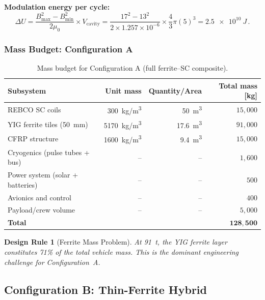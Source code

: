 \documentclass[11pt,a4paper]{article}
\newtheorem{designrule}{Design Rule}
\begin{document}
\textbf{Modulation energy per cycle:}
\begin{equation}
\Delta U = \frac{B_{\max}^2 - B_{\min}^2}{2\mu_0} \times V_{\mathrm{cavity}}
= \frac{17^2 - 13^2}{2 \times 1.257 \times 10^{-6}} \times \frac{4}{3}\pi(5)^3
= \SI{2.5e10}{J}\,.
\end{equation}

\subsubsection{Mass Budget: Configuration A}

\begin{table}[h]
\centering
\caption{Mass budget for Configuration A (full ferrite--SC composite).}
\label{tab:mass_A}
\begin{tabular}{@{}lrrr@{}}
\toprule
Subsystem & Unit mass & Quantity/Area & Total mass [\si{kg}] \\
\midrule
REBCO SC coils & \SI{300}{kg/m^3} & \SI{50}{m^3} & $15{,}000$ \\
YIG ferrite tiles (\SI{50}{mm}) & \SI{5170}{kg/m^3} & \SI{17.6}{m^3} & $91{,}000$ \\
CFRP structure & \SI{1600}{kg/m^3} & \SI{9.4}{m^3} & $15{,}000$ \\
Cryogenics (pulse tubes + bus) & -- & -- & $1{,}600$ \\
Power system (solar + batteries) & -- & -- & $500$ \\
Avionics and control & -- & -- & $400$ \\
Payload/crew volume & -- & -- & $5{,}000$ \\
\midrule
\textbf{Total} & & & $\mathbf{128{,}500}$ \\
\bottomrule
\end{tabular}
\end{table}

\begin{designrule}[Ferrite Mass Problem]
At \SI{91}{t}, the YIG ferrite layer constitutes 71\% of the total vehicle
mass. This is the dominant engineering challenge for Configuration~A.
\end{designrule}

\subsection{Configuration B: Thin-Ferrite Hybrid}
\end{document}
